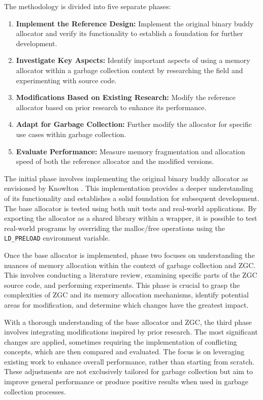 The methodology is divided into five separate phases:

\begin{enumerate}
    \item \textbf{Implement the Reference Design:} Implement the original binary buddy allocator and verify its functionality to establish a foundation for further development.
    \item \textbf{Investigate Key Aspects:} Identify important aspects of using a memory allocator within a garbage collection context by researching the field and experimenting with source code.
    \item \textbf{Modifications Based on Existing Research:} Modify the reference allocator based on prior research to enhance its performance.
    \item \textbf{Adapt for Garbage Collection:} Further modify the allocator for specific use cases within garbage collection.
    \item \textbf{Evaluate Performance:} Measure memory fragmentation and allocation speed of both the reference allocator and the modified versions.
\end{enumerate}

The initial phase involves implementing the original binary buddy allocator as envisioned by Knowlton \cite{buddy}. This implementation provides a deeper understanding of its functionality and establishes a solid foundation for subsequent development. The base allocator is tested using both unit tests and real-world applications. By exporting the allocator as a shared library within a wrapper, it is possible to test real-world programs by overriding the malloc/free operations using the \texttt{LD\_PRELOAD} environment variable.

Once the base allocator is implemented, phase two focuses on understanding the nuances of memory allocation within the context of garbage collection and ZGC. This involves conducting a literature review, examining specific parts of the ZGC source code, and performing experiments. This phase is crucial to grasp the complexities of ZGC and its memory allocation mechanisms, identify potential areas for modification, and determine which changes have the greatest impact.

With a thorough understanding of the base allocator and ZGC, the third phase involves integrating modifications inspired by prior research. The most significant changes are applied, sometimes requiring the implementation of conflicting concepts, which are then compared and evaluated. The focus is on leveraging existing work to enhance overall performance, rather than starting from scratch. These adjustments are not exclusively tailored for garbage collection but aim to improve general performance or produce positive results when used in garbage collection processes.

